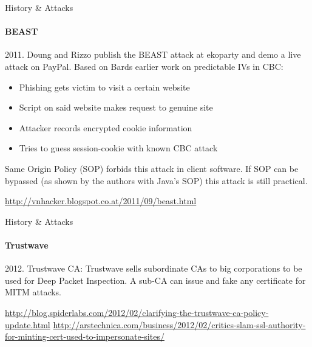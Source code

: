 \documentclass[hyperref={draft}]{beamer}
\begin{document}
\begin{frame}{History \& Attacks}
  \framesubtitle{BEAST}
  2011. Doung and Rizzo publish the BEAST attack at ekoparty and demo a live attack on PayPal. Based on Bards earlier work on predictable IVs in CBC:
  \begin{itemize}
    \item Phishing gets victim to visit a certain website
    \item Script on said website makes request to genuine site
    \item Attacker records encrypted cookie information
    \item Tries to guess session-cookie with known CBC attack
  \end{itemize}
  Same Origin Policy (SOP) forbids this attack in client software. If SOP can be bypassed (as shown by the authors with Java's SOP) this attack is still practical.
  
  \vspace{30px}

  \tiny
  \url{http://vnhacker.blogspot.co.at/2011/09/beast.html}
\end{frame}


\begin{frame}{History \& Attacks}
  \framesubtitle{Trustwave}
  2012. Trustwave CA: Trustwave sells subordinate CAs to big corporations to be used for Deep Packet Inspection.
  \newline
  \newline
  A sub-CA can issue and fake any certificate for MITM attacks.


  \vspace{80px}

  \tiny
  \url{http://blog.spiderlabs.com/2012/02/clarifying-the-trustwave-ca-policy-update.html}
  \url{http://arstechnica.com/business/2012/02/critics-slam-ssl-authority-for-minting-cert-used-to-impersonate-sites/}
\end{frame}
\end{document}
